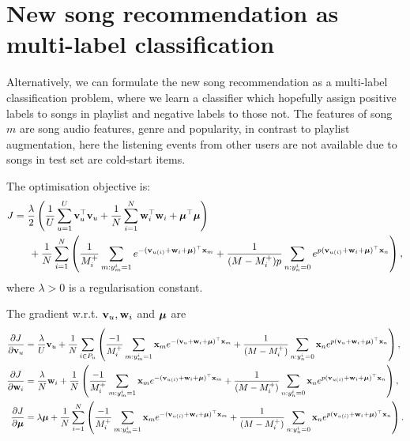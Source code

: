 \section{New song recommendation as multi-label classification}

Alternatively, we can formulate the new song recommendation as a multi-label classification problem,
where we learn a classifier which hopefully assign positive labels to songs in playlist and negative labels to those not.
The features of song $m$ are song audio features, genre and popularity, in contrast to playlist augmentation,
here the listening events from other users are not available due to songs in test set are cold-start items.

The optimisation objective is:
\begin{equation*}
\begin{aligned}
J &= \frac{\lambda}{2} \left( \frac{1}{U} \sum_{u=1}^U \mathbf{v}_u^\top \mathbf{v}_u 
     + \frac{1}{N} \sum_{i=1}^N \mathbf{w}_i^\top \mathbf{w}_i + \bm{\mu}^\top \bm{\mu} \right) \\
& \hspace{1.5em}
     + \frac{1}{N} \sum_{i=1}^N \left( \frac{1}{M_i^+} \sum_{m: y_m^i = 1} e^{-(\mathbf{v}_{u(i)} + \mathbf{w}_i + \bm{\mu})^\top \mathbf{x}_m} 
     + \frac{1}{(M - M_i^+) p} \sum_{n: y_n^i = 0} e^{p (\mathbf{v}_{u(i)} + \mathbf{w}_i + \bm{\mu})^\top \mathbf{x}_n} \right),
\end{aligned}
\end{equation*}
where $\lambda > 0$ is a regularisation constant.


The gradient w.r.t. $\mathbf{v}_u, \mathbf{w}_i$ and $\bm{\mu}$ are
\begin{equation*}
\begin{aligned}
\frac{\partial J}{\partial \mathbf{v}_u}
&= \frac{\lambda}{U} \mathbf{v}_u + \frac{1}{N} \sum_{i \in P_u} \left( 
   \frac{-1}{M_i^+} \sum_{m: y_m^i = 1} \mathbf{x}_m e^{-(\mathbf{v}_{u} + \mathbf{w}_i + \bm{\mu})^\top \mathbf{x}_m} 
   + \frac{1}{(M - M_i^+)} \sum_{n: y_n^i = 0} \mathbf{x}_n e^{p (\mathbf{v}_{u} + \mathbf{w}_i + \bm{\mu})^\top \mathbf{x}_n} \right), \\
\frac{\partial J}{\partial \mathbf{w}_i}
&= \frac{\lambda}{N} \mathbf{w}_i + \frac{1}{N} \left( 
   \frac{-1}{M_i^+} \sum_{m: y_m^i = 1} \mathbf{x}_m e^{-(\mathbf{v}_{u(i)} + \mathbf{w}_i + \bm{\mu})^\top \mathbf{x}_m} 
   + \frac{1}{(M - M_i^+)} \sum_{n: y_n^i = 0} \mathbf{x}_n e^{p (\mathbf{v}_{u(i)} + \mathbf{w}_i + \bm{\mu})^\top \mathbf{x}_n} \right), \\
\frac{\partial J}{\partial \bm{\mu}}
&= \lambda \bm{\mu} + \frac{1}{N} \sum_{i=1}^N \left( 
   \frac{-1}{M_i^+} \sum_{m: y_m^i = 1} \mathbf{x}_m e^{-(\mathbf{v}_{u(i)} + \mathbf{w}_i + \bm{\mu})^\top \mathbf{x}_m} 
   + \frac{1}{(M - M_i^+)} \sum_{n: y_n^i = 0} \mathbf{x}_n e^{p (\mathbf{v}_{u(i)} + \mathbf{w}_i + \bm{\mu})^\top \mathbf{x}_n} \right).
\end{aligned}
\end{equation*}
